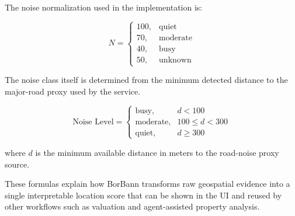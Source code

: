 The noise normalization used in the implementation is:

\begin{equation}
N =
\begin{cases}
100, & \text{quiet} \\
70, & \text{moderate} \\
40, & \text{busy} \\
50, & \text{unknown}
\end{cases}
\end{equation}

The noise class itself is determined from the minimum detected distance to the major-road proxy used by the service.

\begin{equation}
\text{Noise Level} =
\begin{cases}
\text{busy}, & d < 100 \\
\text{moderate}, & 100 \leq d < 300 \\
\text{quiet}, & d \geq 300
\end{cases}
\end{equation}

where $d$ is the minimum available distance in meters to the road-noise proxy source.

These formulas explain how BorBann transforms raw geospatial evidence into a single interpretable location score that can be shown in the UI and reused by other workflows such as valuation and agent-assisted property analysis.
